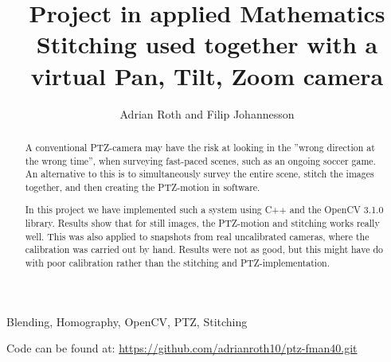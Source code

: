 \documentclass[10 pt, journal]{IEEEtran}
\title{Project in applied Mathematics \\
  \large Stitching used together with a virtual Pan, Tilt, Zoom camera}
\author{Adrian Roth and Filip Johannesson}
\begin{document}
\maketitle
\begin{abstract}
	A conventional PTZ-camera may have the risk at looking in the ''wrong direction at the wrong time'', when surveying fast-paced scenes, such as an ongoing soccer game. An alternative to this is to simultaneously survey the entire scene, stitch the images together, and then creating the PTZ-motion in software.

	In this project we have implemented such a system using C++ and the OpenCV 3.1.0 library. Results show that for still images, the PTZ-motion and stitching works really well. 
	This was also applied to snapshots from real uncalibrated cameras, where the calibration was carried out by hand. 
	Results were not as good, but this might have do with poor calibration rather than the stitching and PTZ-implementation.
\end{abstract}
\begin{IEEEkeywords}
	Blending, Homography, OpenCV, PTZ, Stitching 
\end{IEEEkeywords}
Code can be found at:
\url{https://github.com/adrianroth10/ptz-fman40.git}














\newpage


\end{document}

